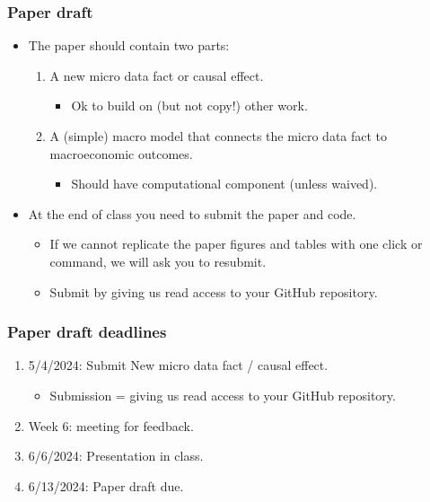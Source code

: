 \documentclass[english,xcolor=svgnames]{beamer}
\begin{document}
\begin{frame}
\frametitle[alignment=center]{Paper draft}
\begin{itemize}
	\item The paper should contain two parts:
	\begin{enumerate}
		\item A new micro data fact or causal effect.
		\begin{itemize}
			\item Ok to build on (but not copy!) other work.
		\end{itemize}
		\item A (simple) macro model that connects the micro data fact to macroeconomic outcomes.
		\begin{itemize}
			\item Should have computational component (unless waived).
		\end{itemize}
	\end{enumerate}
	\item At the end of class you need to submit the paper and code.
	\begin{itemize}
		\item If we cannot replicate the paper figures and tables with one click or command, we will ask you to resubmit.
		\item Submit by giving us read access to your GitHub repository.
	\end{itemize}
\end{itemize}
\end{frame}


\begin{frame}
\frametitle[alignment=center]{Paper draft deadlines}
\begin{enumerate}
	\item 5/4/2024: Submit New micro data fact / causal effect. 
	\begin{itemize}
		\item Submission = giving us read access to your GitHub repository.
	\end{itemize}
	\item Week 6: meeting for feedback.
	\item 6/6/2024: Presentation in class.
	\item 6/13/2024: Paper draft due.
\end{enumerate}
\end{frame}
\end{document}
